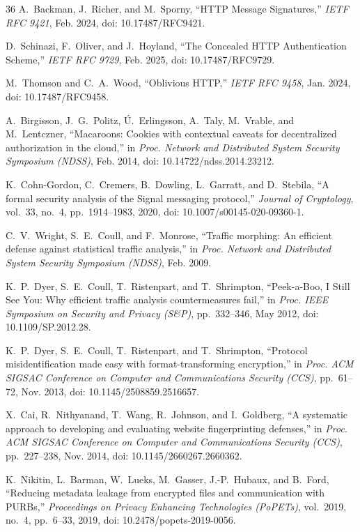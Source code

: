 \documentclass[conference,10pt]{IEEEtran}
\begin{document}
\begin{thebibliography}{36}
A.~Backman, J.~Richer, and M.~Sporny, ``HTTP Message Signatures,'' \emph{IETF RFC 9421}, Feb. 2024, doi: 10.17487/RFC9421.

D.~Schinazi, F.~Oliver, and J.~Hoyland, ``The Concealed HTTP Authentication Scheme,'' \emph{IETF RFC 9729}, Feb. 2025, doi: 10.17487/RFC9729.

M.~Thomson and C.~A.~Wood, ``Oblivious HTTP,'' \emph{IETF RFC 9458}, Jan. 2024, doi: 10.17487/RFC9458.

A.~Birgisson, J.~G.~Politz, {\'U}.~Erlingsson, A.~Taly, M.~Vrable, and M.~Lentczner, ``Macaroons: Cookies with contextual caveats for decentralized authorization in the cloud,'' in \emph{Proc. Network and Distributed System Security Symposium (NDSS)}, Feb. 2014, doi: 10.14722/ndss.2014.23212.

K.~Cohn-Gordon, C.~Cremers, B.~Dowling, L.~Garratt, and D.~Stebila, ``A formal security analysis of the Signal messaging protocol,'' \emph{Journal of Cryptology}, vol.~33, no.~4, pp.~1914--1983, 2020, doi: 10.1007/s00145-020-09360-1.

C.~V.~Wright, S.~E.~Coull, and F.~Monrose, ``Traffic morphing: An efficient defense against statistical traffic analysis,'' in \emph{Proc. Network and Distributed System Security Symposium (NDSS)}, Feb. 2009.

K.~P.~Dyer, S.~E.~Coull, T.~Ristenpart, and T.~Shrimpton, ``Peek-a-Boo, I Still See You: Why efficient traffic analysis countermeasures fail,'' in \emph{Proc. IEEE Symposium on Security and Privacy (S\&P)}, pp.~332--346, May 2012, doi: 10.1109/SP.2012.28.

K.~P.~Dyer, S.~E.~Coull, T.~Ristenpart, and T.~Shrimpton, ``Protocol misidentification made easy with format-transforming encryption,'' in \emph{Proc. ACM SIGSAC Conference on Computer and Communications Security (CCS)}, pp.~61--72, Nov. 2013, doi: 10.1145/2508859.2516657.

X.~Cai, R.~Nithyanand, T.~Wang, R.~Johnson, and I.~Goldberg, ``A systematic approach to developing and evaluating website fingerprinting defenses,'' in \emph{Proc. ACM SIGSAC Conference on Computer and Communications Security (CCS)}, pp.~227--238, Nov. 2014, doi: 10.1145/2660267.2660362.

K.~Nikitin, L.~Barman, W.~Lueks, M.~Gasser, J.-P.~Hubaux, and B.~Ford, ``Reducing metadata leakage from encrypted files and communication with PURBs,'' \emph{Proceedings on Privacy Enhancing Technologies (PoPETs)}, vol.~2019, no.~4, pp.~6--33, 2019, doi: 10.2478/popets-2019-0056.


\end{thebibliography}
\end{document}
